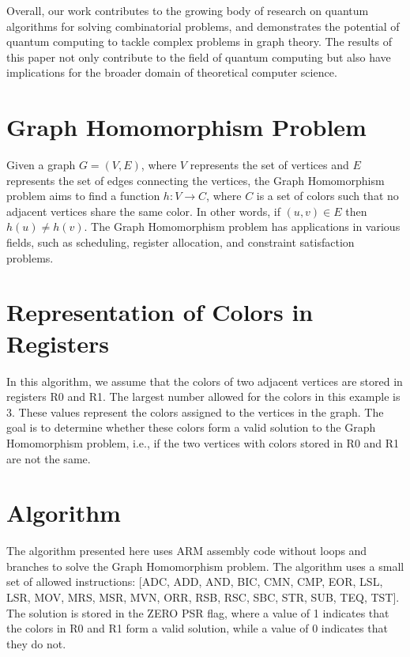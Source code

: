 Overall, our work contributes to the growing body of research on quantum algorithms for solving combinatorial problems, and demonstrates the potential of quantum computing to tackle complex problems in graph theory. The results of this paper not only contribute to the field of quantum computing but also have implications for the broader domain of theoretical computer science.

\section{Graph Homomorphism Problem}

Given a graph $G = (V, E)$, where $V$ represents the set of vertices and $E$ represents the set of edges connecting the vertices, the Graph Homomorphism problem aims to find a function $h : V \to C$, where $C$ is a set of colors such that no adjacent vertices share the same color. In other words, if $(u, v) \in E$ then $h(u) \neq h(v)$. The Graph Homomorphism problem has applications in various fields, such as scheduling, register allocation, and constraint satisfaction problems.

\section{Representation of Colors in Registers}

In this algorithm, we assume that the colors of two adjacent vertices are stored in registers R0 and R1. The largest number allowed for the colors in this example is 3. These values represent the colors assigned to the vertices in the graph. The goal is to determine whether these colors form a valid solution to the Graph Homomorphism problem, i.e., if the two vertices with colors stored in R0 and R1 are not the same.

\section{Algorithm}

The algorithm presented here uses ARM assembly code without loops and branches to solve the Graph Homomorphism problem. The algorithm uses a small set of allowed instructions: [ADC, ADD, AND, BIC, CMN, CMP, EOR, LSL, LSR, MOV, MRS, MSR, MVN, ORR, RSB, RSC, SBC, STR, SUB, TEQ, TST]. The solution is stored in the ZERO PSR flag, where a value of 1 indicates that the colors in R0 and R1 form a valid solution, while a value of 0 indicates that they do not.

